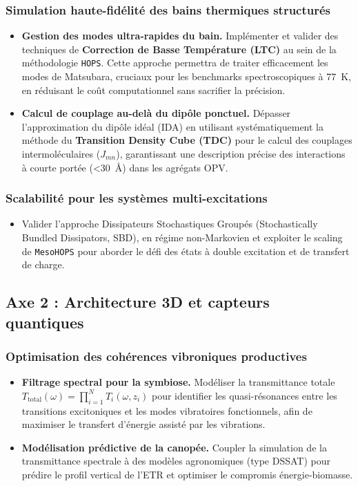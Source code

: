 \documentclass[12pt, a4paper]{article}
\begin{document}
\subsubsection{Simulation haute-fidélité des bains thermiques structurés}
\begin{itemize}
    \item \textbf{Gestion des modes ultra-rapides du bain.} Implémenter et valider des techniques de \textbf{Correction de Basse Température (LTC)} au sein de la méthodologie \texttt{HOPS}. Cette approche permettra de traiter efficacement les modes de Matsubara, cruciaux pour les benchmarks spectroscopiques à \SI{77}{\kelvin}, en réduisant le coût computationnel sans sacrifier la précision.

    \item \textbf{Calcul de couplage au-delà du dipôle ponctuel.} Dépasser l'approximation du dipôle idéal (IDA) en utilisant systématiquement la méthode du \textbf{Transition Density Cube (TDC)} pour le calcul des couplages intermoléculaires ($J_{mn}$), garantissant une description précise des interactions à courte portée (\SI{<30}{\angstrom}) dans les agrégats OPV.
\end{itemize}

\subsubsection{Scalabilité pour les systèmes multi-excitations}
\begin{itemize}
\item Valider l'approche Dissipateurs Stochastiques Groupés (Stochastically Bundled Dissipators, SBD), en régime non-Markovien et exploiter le scaling de \texttt{MesoHOPS} pour aborder le défi des états à double excitation et de transfert de charge.
\end{itemize}

\subsection{Axe 2 : Architecture 3D et capteurs quantiques}

\subsubsection{Optimisation des cohérences vibroniques productives}
\begin{itemize}
    \item \textbf{Filtrage spectral pour la symbiose.} Modéliser la transmittance totale $T_{\text{total}}(\omega) = \prod_{i=1}^N T_i(\omega, z_i)$ pour identifier les quasi-résonances entre les transitions excitoniques et les modes vibratoires fonctionnels, afin de maximiser le transfert d'énergie assisté par les vibrations.

    \item \textbf{Modélisation prédictive de la canopée.} Coupler la simulation de la transmittance spectrale à des modèles agronomiques (type DSSAT) pour prédire le profil vertical de l'ETR et optimiser le compromis énergie-biomasse.
\end{itemize}
\end{document}
